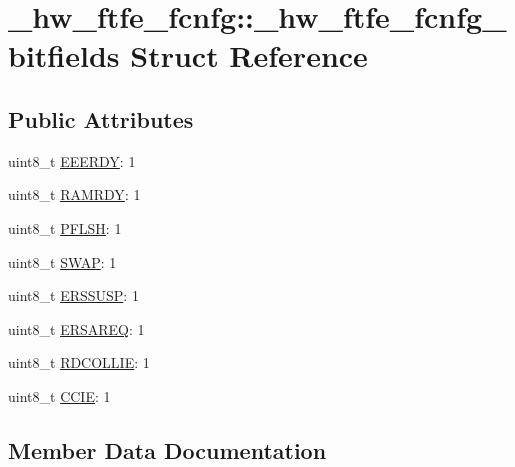 \hypertarget{struct__hw__ftfe__fcnfg_1_1__hw__ftfe__fcnfg__bitfields}{}\section{\+\_\+hw\+\_\+ftfe\+\_\+fcnfg\+:\+:\+\_\+hw\+\_\+ftfe\+\_\+fcnfg\+\_\+bitfields Struct Reference}
\label{struct__hw__ftfe__fcnfg_1_1__hw__ftfe__fcnfg__bitfields}
\subsection*{Public Attributes}
\begin{DoxyCompactItemize}
\item 
uint8\+\_\+t \hyperlink{struct__hw__ftfe__fcnfg_1_1__hw__ftfe__fcnfg__bitfields_a3551e3c9283dc53bbddd32ff3d6053d6}{E\+E\+E\+R\+DY}\+: 1
\item 
uint8\+\_\+t \hyperlink{struct__hw__ftfe__fcnfg_1_1__hw__ftfe__fcnfg__bitfields_a2a7927b6325620d4e9c80b0546e1b59a}{R\+A\+M\+R\+DY}\+: 1
\item 
uint8\+\_\+t \hyperlink{struct__hw__ftfe__fcnfg_1_1__hw__ftfe__fcnfg__bitfields_aee4ee46a2d595271e1203893db883d12}{P\+F\+L\+SH}\+: 1
\item 
uint8\+\_\+t \hyperlink{struct__hw__ftfe__fcnfg_1_1__hw__ftfe__fcnfg__bitfields_ab2af7354b58035c4b90f1a65bf51e175}{S\+W\+AP}\+: 1
\item 
uint8\+\_\+t \hyperlink{struct__hw__ftfe__fcnfg_1_1__hw__ftfe__fcnfg__bitfields_ae25ac529a12a970ee18e4d8d6081b96d}{E\+R\+S\+S\+U\+SP}\+: 1
\item 
uint8\+\_\+t \hyperlink{struct__hw__ftfe__fcnfg_1_1__hw__ftfe__fcnfg__bitfields_a6f74985cd0bfe93551f1329bb14e0700}{E\+R\+S\+A\+R\+EQ}\+: 1
\item 
uint8\+\_\+t \hyperlink{struct__hw__ftfe__fcnfg_1_1__hw__ftfe__fcnfg__bitfields_a86e336f400c7ca5383b474209648d36b}{R\+D\+C\+O\+L\+L\+IE}\+: 1
\item 
uint8\+\_\+t \hyperlink{struct__hw__ftfe__fcnfg_1_1__hw__ftfe__fcnfg__bitfields_a1ff206ce4fdcd30720446f72b20687f0}{C\+C\+IE}\+: 1
\end{DoxyCompactItemize}


\subsection{Member Data Documentation}
